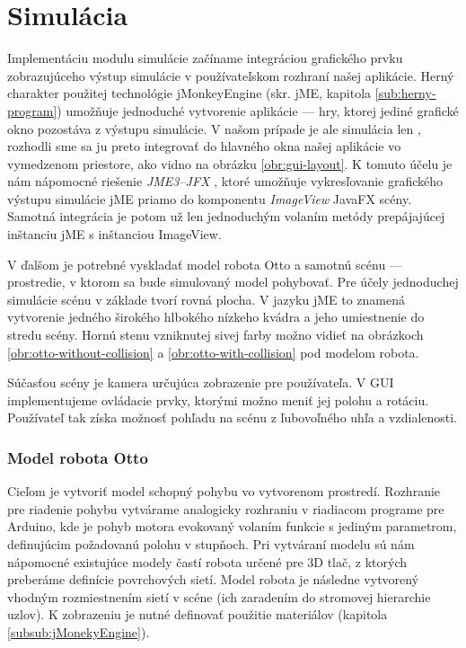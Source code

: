 \section{Simulácia}
Implementáciu modulu simulácie začíname integráciou grafického prvku zobrazujúceho výstup simulácie v používateľskom rozhraní našej aplikácie. Herný charakter použitej technológie jMonkeyEngine (skr. jME, kapitola \ref{sub:herny-program}) umožňuje jednoduché vytvorenie aplikácie --- hry, ktorej jediné grafické okno pozostáva z výstupu simulácie. V našom prípade je ale simulácia len , rozhodli sme sa ju preto integrovať do hlavného okna našej aplikácie vo vymedzenom priestore, ako vidno na obrázku \ref{obr:gui-layout}. K tomuto účelu je nám nápomocné riešenie \textit{JME3--JFX} \cite{jmejfx}, ktoré umožňuje vykresľovanie grafického výstupu simulácie jME priamo do komponentu \textit{ImageView} JavaFX scény. Samotná integrácia je potom už len jednoduchým volaním metódy prepájajúcej inštanciu jME s inštanciou ImageView.

V ďalšom je potrebné vyskladať model robota Otto a samotnú scénu --- prostredie, v ktorom sa bude simulovaný model pohybovať. Pre účely jednoduchej simulácie scénu v základe tvorí rovná plocha. V jazyku jME to znamená vytvorenie jedného širokého hlbokého nízkeho kvádra a jeho umiestnenie do stredu scény. Hornú stenu vzniknutej  sivej farby možno vidieť na obrázkoch \ref{obr:otto-without-collision} a \ref{obr:otto-with-collision} pod modelom robota.

Súčasťou scény je kamera určujúca zobrazenie pre používateľa. V GUI implementujeme ovládacie prvky, ktorými možno meniť jej polohu a rotáciu. Používateľ tak získa možnosť pohľadu na scénu z ľubovoľného uhľa a vzdialenosti. 

\subsubsection{Model robota Otto}
Cieľom je vytvoriť model schopný pohybu vo vytvorenom prostredí. Rozhranie pre riadenie pohybu vytvárame analogicky rozhraniu v riadiacom programe pre Arduino, kde je pohyb motora evokovaný volaním funkcie s jediným parametrom, definujúcim požadovanú polohu v stupňoch. Pri vytváraní modelu sú nám nápomocné existujúce modely častí robota určené pre 3D tlač, z ktorých preberáme definície povrchových sietí. Model robota je následne vytvorený vhodným rozmiestnením sietí v scéne (ich zaradením do stromovej hierarchie uzlov). K zobrazeniu je nutné definovať použitie materiálov (kapitola \ref{subsub:jMonekyEngine}).

